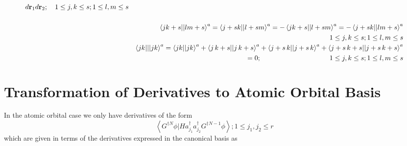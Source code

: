 \documentclass{article}
\begin{document}
\begin{eqnarray}
d\mathbf{r}_{1}d\mathbf{r}_{2};\quad 1\leq j,k\leq s;1\leq l,m\leq s \\
&&  \notag \\
&&\left\langle jk+s||lm+s\right\rangle ^{a}=\left\langle
j+sk||l+sm\right\rangle ^{a}=-\left\langle jk+s||l+sm\right\rangle
^{a}=-\left\langle j+sk||lm+s\right\rangle ^{a}  \notag \\
&&\left. {}\right. \quad \qquad \qquad \quad \qquad \qquad \quad \quad
\qquad \quad \qquad \qquad \qquad \quad 1\leq j,k\leq s;1\leq l,m\leq s \\
&&\left\langle jk|||jk\right\rangle ^{a}=\left\langle jk||jk\right\rangle
^{a}+\left\langle j\,k+s||j\,k+s\right\rangle ^{a}+\left\langle
j+s\,k||j+s\,k\right\rangle ^{a}+\left\langle
j+s\,k+s||j+s\,k+s\right\rangle ^{a}  \notag \\
&&\left. {}\right. \quad \qquad \qquad \quad \qquad \qquad =0;\quad \qquad
\qquad \quad \qquad \qquad 1\leq j,k\leq s;1\leq l,m\leq s
\end{eqnarray}

\section{Transformation of Derivatives to Atomic Orbital Basis}

In the atomic orbital case we only have derivatives of the form%
\begin{equation}
\left\langle G^{\dagger N}\phi |Ha_{j_{1}}^{\dagger }a_{j_{2}}^{\dagger
}G^{\dagger N-1}\phi \right\rangle ;1\leq j_{1},j_{2}\leq r
\end{equation}
which are given in terms of the derivatives expressed in the canonical basis
as
\end{document}
